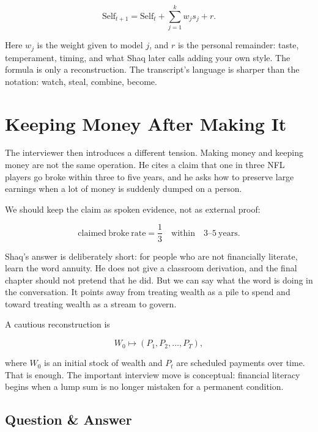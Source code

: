 \begin{equation}
\mathrm{Self}_{t+1}
=
\mathrm{Self}_{t}
+
\sum_{j=1}^{k} w_j s_j
+
r.
\end{equation}

Here \(w_j\) is the weight given to model \(j\), and \(r\) is the personal remainder: taste, temperament, timing, and what Shaq later calls adding your own style. The formula is only a reconstruction. The transcript's language is sharper than the notation: watch, steal, combine, become.

\section{Keeping Money After Making It}

The interviewer then introduces a different tension. Making money and keeping money are not the same operation. He cites a claim that one in three NFL players go broke within three to five years, and he asks how to preserve large earnings when a lot of money is suddenly dumped on a person.

We should keep the claim as spoken evidence, not as external proof:

\begin{equation}
\mathrm{claimed\ broke\ rate} = \frac{1}{3}
\quad \mathrm{within}\quad 3\text{--}5\ \mathrm{years}.
\end{equation}

Shaq's answer is deliberately short: for people who are not financially literate, learn the word annuity. He does not give a classroom derivation, and the final chapter should not pretend that he did. But we can say what the word is doing in the conversation. It points away from treating wealth as a pile to spend and toward treating wealth as a stream to govern.

A cautious reconstruction is

\begin{equation}
W_0 \longmapsto (P_1,P_2,\ldots,P_T),
\end{equation}

where \(W_0\) is an initial stock of wealth and \(P_t\) are scheduled payments over time. That is enough. The important interview move is conceptual: financial literacy begins when a lump sum is no longer mistaken for a permanent condition.

\subsection{Question \& Answer}

